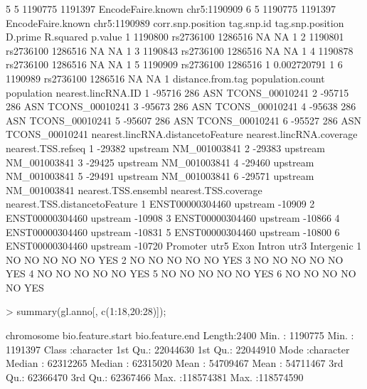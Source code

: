 \documentclass[12pt,fullpage]{article}
\begin{document}
\begin{Schunk}
\begin{Soutput}
5          5           1190775         1191397 EncodeFaire.known chr5:1190909
6          5           1190775         1191397 EncodeFaire.known chr5:1190989
  corr.snp.position tag.snp.id tag.snp.position D.prime   R.squared p.value
1           1190800  rs2736100          1286516      NA          NA       1
2           1190801  rs2736100          1286516      NA          NA       1
3           1190843  rs2736100          1286516      NA          NA       1
4           1190878  rs2736100          1286516      NA          NA       1
5           1190909  rs2736100          1286516       1 0.002720791       1
6           1190989  rs2736100          1286516      NA          NA       1
  distance.from.tag population.count population nearest.lincRNA.ID
1            -95716              286        ASN     TCONS_00010241
2            -95715              286        ASN     TCONS_00010241
3            -95673              286        ASN     TCONS_00010241
4            -95638              286        ASN     TCONS_00010241
5            -95607              286        ASN     TCONS_00010241
6            -95527              286        ASN     TCONS_00010241
  nearest.lincRNA.distancetoFeature nearest.lincRNA.coverage nearest.TSS.refseq
1                            -29382                 upstream       NM_001003841
2                            -29383                 upstream       NM_001003841
3                            -29425                 upstream       NM_001003841
4                            -29460                 upstream       NM_001003841
5                            -29491                 upstream       NM_001003841
6                            -29571                 upstream       NM_001003841
  nearest.TSS.ensembl nearest.TSS.coverage nearest.TSS.distancetoFeature
1     ENST00000304460             upstream                        -10909
2     ENST00000304460             upstream                        -10908
3     ENST00000304460             upstream                        -10866
4     ENST00000304460             upstream                        -10831
5     ENST00000304460             upstream                        -10800
6     ENST00000304460             upstream                        -10720
  Promoter utr5 Exon Intron utr3 Intergenic
1       NO   NO   NO     NO   NO        YES
2       NO   NO   NO     NO   NO        YES
3       NO   NO   NO     NO   NO        YES
4       NO   NO   NO     NO   NO        YES
5       NO   NO   NO     NO   NO        YES
6       NO   NO   NO     NO   NO        YES
\end{Soutput}
\begin{Sinput}
> summary(gl.anno[, c(1:18,20:28)]);
\end{Sinput}
\begin{Soutput}
  chromosome        bio.feature.start   bio.feature.end    
 Length:2400        Min.   :  1190775   Min.   :  1191397  
 Class :character   1st Qu.: 22044630   1st Qu.: 22044910  
 Mode  :character   Median : 62312265   Median : 62315020  
                    Mean   : 54709467   Mean   : 54711467  
                    3rd Qu.: 62366470   3rd Qu.: 62367466  
                    Max.   :118574381   Max.   :118574590  
                                                           

\end{Soutput}
\end{Schunk}
\end{document}
